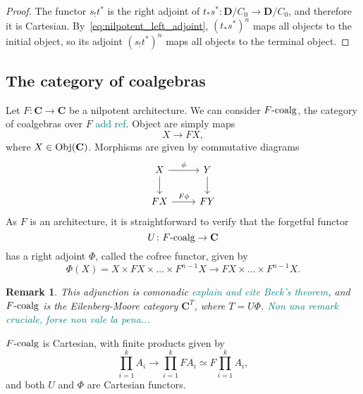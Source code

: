 \documentclass[12pt]{article}
\newtheorem{remark}{Remark}
\newcommand{\pietro}[1]{\textcolor{teal}{#1}}
\newcommand{\Obj}{{\textnormal{Obj}}}
\newcommand{\Cat}{{\mathbf{C}}}
\newcommand{\DCat}{{\mathbf{D}}}
\newcommand{\Coalg}{{F\textnormal{-coalg}}}
\begin{document}
\begin{proof}
    The functor $s_!t^*$ is the right adjoint of  $t_*s^*\colon \DCat/C_0 \rightarrow \DCat/C_0$, and therefore it is Cartesian. By~\cref{eq:nilpotent_left_adjoint}, $(t_*s^*)^n$ maps all objects to the initial object, so its adjoint $(s_!t^*)^n$ maps all objects to the terminal object.
\end{proof}

\subsection{The category of coalgebras}

Let $F\colon \Cat \rightarrow \Cat$ be a nilpotent architecture. We can consider $\Coalg$, the category of coalgebras over $F$ \pietro{add ref}. Object are simply maps
\begin{equation*}
    X \rightarrow F X,
\end{equation*}
where $X \in \Obj(\Cat)$. Morphisms are given by commutative diagrams
\begin{equation*}
    \begin{tikzcd}
        X \arrow[rightarrow]{d} \arrow[rightarrow]{r}{\phi}
        & Y \arrow[rightarrow]{d} \\
        FX \arrow[rightarrow]{r}{F \phi}
        & FY
    \end{tikzcd}
\end{equation*}
As $F$ is an architecture, it is straightforward to verify that the forgetful functor
\begin{equation*}
    U \colon \Coalg \rightarrow \Cat
\end{equation*}
has a right adjoint $\Phi$, called the cofree functor, given by
\begin{equation*}
    \Phi(X) = X \times F X \times \dots \times F^{n-1} X \rightarrow F X \times \dots \times F^{n-1} X.
\end{equation*}

\begin{remark}
    This adjunction is comonadic \pietro{explain and cite Beck's theorem}, and $\Coalg$ is the Eilenberg-Moore category $\Cat^T$, where $T = U\Phi$. \pietro{ Non una remark cruciale, forse non vale la pena...}
\end{remark}

$\Coalg$ is Cartesian, with finite products given by
\begin{equation*}
    \prod_{i=1}^k A_i \rightarrow \prod_{i=1}^k F A_i \simeq F \prod_{i=1}^k A_i,
\end{equation*}
and both $U$ and $\Phi$ are Cartesian functors.
\end{document}
